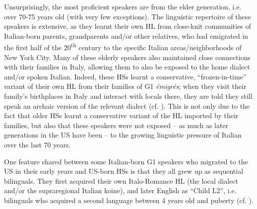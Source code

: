\documentclass[output=paper,hidelinks]{langscibook}
\begin{document}
Unsurprisingly, the most proficient speakers are from the elder generation, i.e. over 70-75 years old (with very few exceptions). The linguistic repertoire of these speakers is extensive, as they learnt their own HL from close-knit communities of Italian-born parents, grandparents and/or other relatives, who had emigrated in the first half of the 20\textsuperscript{th} century to the specific Italian areas/neighborhoods of New York City. Many of these elderly speakers also maintained close connections with their families in Italy, allowing them to also be exposed to the home dialect and/or spoken Italian. Indeed, these HSs learnt a conservative, ``frozen-in-time'' variant of their own HL from their families of G1 \textit{émigrés}; when they visit their family’s birthplaces in Italy and interact with locals there, they are told they still speak an archaic version of the relevant dialect (cf. \citealt[114]{AalberseMuysken2019}). This is not only due to the fact that older HSs learnt a conservative variant of the HL imported by their families, but also that these speakers were not exposed – as much as later generations in the US have been -- to the growing linguistic pressure of Italian over the last 70 years.

One feature shared between some Italian-born G1 speakers who migrated to the US in their early years and US-born HSs is that they all grew up as sequential bilinguals. They first acquired their own Italo-Romance HL (the local dialect and/or the supraregional Italian koine), and later English as ``Child L2'', i.e. bilinguals who acquired a second language between 4 years old and puberty (cf. \citealt[117]{AalberseMuysken2019}).
\end{document}
